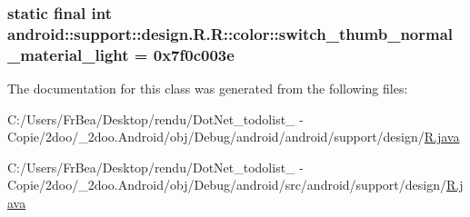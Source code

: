 \hypertarget{classandroid_1_1support_1_1design_1_1_r_1_1color_a79567316c2e58f494eabf5641084715}{
\subsubsection[{switch\_\-thumb\_\-normal\_\-material\_\-light}]{\setlength{\rightskip}{0pt plus 5cm}static final int android::support::design.R.R::color::switch\_\-thumb\_\-normal\_\-material\_\-light = 0x7f0c003e}}
\label{classandroid_1_1support_1_1design_1_1_r_1_1color_a79567316c2e58f494eabf5641084715}




The documentation for this class was generated from the following files:\begin{CompactItemize}
\item 
C:/Users/FrBea/Desktop/rendu/DotNet\_\-todolist\_ - Copie/2doo/\_\-2doo.Android/obj/Debug/android/android/support/design/\hyperlink{android_2support_2design_2_r_8java}{R.java}\item 
C:/Users/FrBea/Desktop/rendu/DotNet\_\-todolist\_ - Copie/2doo/\_\-2doo.Android/obj/Debug/android/src/android/support/design/\hyperlink{src_2android_2support_2design_2_r_8java}{R.java}\end{CompactItemize}
